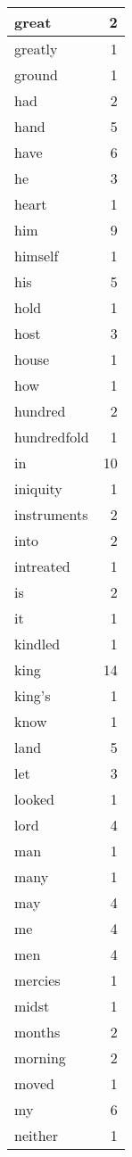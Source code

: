 \begin{center}
\begin{longtable}{l|r}
great & 2 \\ \hline
greatly & 1 \\ \hline
ground & 1 \\ \hline
had & 2 \\ \hline
hand & 5 \\ \hline
have & 6 \\ \hline
he & 3 \\ \hline
heart & 1 \\ \hline
him & 9 \\ \hline
himself & 1 \\ \hline
his & 5 \\ \hline
hold & 1 \\ \hline
host & 3 \\ \hline
house & 1 \\ \hline
how & 1 \\ \hline
hundred & 2 \\ \hline
hundredfold & 1 \\ \hline
in & 10 \\ \hline
iniquity & 1 \\ \hline
instruments & 2 \\ \hline
into & 2 \\ \hline
intreated & 1 \\ \hline
is & 2 \\ \hline
it & 1 \\ \hline
kindled & 1 \\ \hline
king & 14 \\ \hline
king's & 1 \\ \hline
know & 1 \\ \hline
land & 5 \\ \hline
let & 3 \\ \hline
looked & 1 \\ \hline
lord & 4 \\ \hline
man & 1 \\ \hline
many & 1 \\ \hline
may & 4 \\ \hline
me & 4 \\ \hline
men & 4 \\ \hline
mercies & 1 \\ \hline
midst & 1 \\ \hline
months & 2 \\ \hline
morning & 2 \\ \hline
moved & 1 \\ \hline
my & 6 \\ \hline
neither & 1 \\ \hline

\end{longtable}
\end{center}
